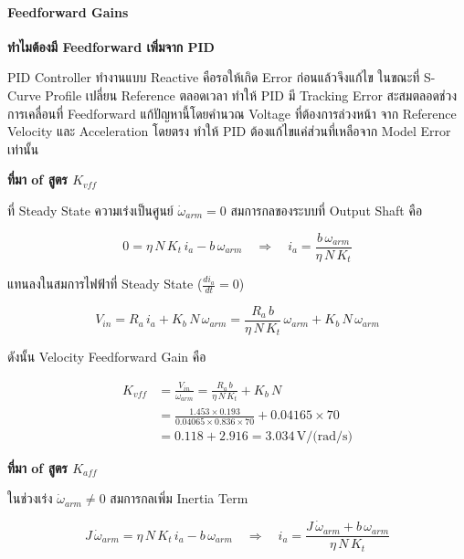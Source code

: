 \paragraph{Feedforward Gains}

\textbf{ทำไมต้องมี Feedforward เพิ่มจาก PID}

PID Controller ทำงานแบบ Reactive คือรอให้เกิด Error ก่อนแล้วจึงแก้ไข
ในขณะที่ S-Curve Profile เปลี่ยน Reference ตลอดเวลา
ทำให้ PID มี Tracking Error สะสมตลอดช่วงการเคลื่อนที่
Feedforward แก้ปัญหานี้โดยคำนวณ Voltage ที่ต้องการล่วงหน้า
จาก Reference Velocity และ Acceleration โดยตรง
ทำให้ PID ต้องแก้ไขแค่ส่วนที่เหลือจาก Model Error เท่านั้น

\textbf{ที่มา of สูตร $K_{vff}$}

ที่ Steady State ความเร่งเป็นศูนย์ $\dot{\omega}_{arm} = 0$
สมการกลของระบบที่ Output Shaft คือ

\begin{equation}
  0 = \eta\, N\, K_t\, i_a - b\,\omega_{arm}
  \quad \Rightarrow \quad
  i_a = \frac{b\,\omega_{arm}}{\eta\, N\, K_t}
  \label{eq:ia_ss}
\end{equation}

แทนลงในสมการไฟฟ้าที่ Steady State ($\frac{di_a}{dt} = 0$)

\begin{equation}
  V_{in} = R_a\, i_a + K_b\, N\,\omega_{arm}
         = \frac{R_a\, b}{\eta\, N\, K_t}\,\omega_{arm} + K_b\, N\,\omega_{arm}
  \label{eq:vin_ss}
\end{equation}

ดังนั้น Velocity Feedforward Gain คือ

\begin{equation}
  \begin{split}
    K_{vff} &= \frac{V_{in}}{\omega_{arm}}
             = \frac{R_a\, b}{\eta\, N\, K_t} + K_b\, N \\
            &= \frac{1.453 \times 0.193}{0.04065 \times 0.836 \times 70}
               + 0.04165 \times 70 \\
            &= 0.118 + 2.916 = 3.034\,\text{V/(rad/s)}
  \end{split}
  \label{eq:Kvff}
\end{equation}

\textbf{ที่มา of สูตร $K_{aff}$}

ในช่วงเร่ง $\dot{\omega}_{arm} \neq 0$ สมการกลเพิ่ม Inertia Term

\begin{equation}
  J\,\dot{\omega}_{arm} = \eta\, N\, K_t\, i_a - b\,\omega_{arm}
  \quad \Rightarrow \quad
  i_a = \frac{J\,\dot{\omega}_{arm} + b\,\omega_{arm}}{\eta\, N\, K_t}
  \label{eq:ia_accel}
\end{equation}

